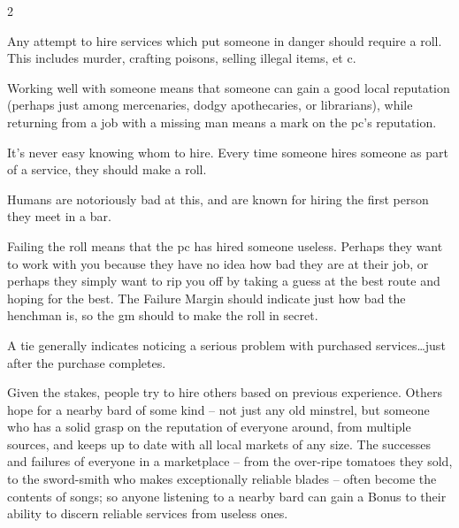 \begin{multicols}{2}

Any attempt to hire services which put someone in danger should require a roll.
This includes murder, crafting poisons, selling illegal items, et c.

Working well with someone means that someone can gain a good local reputation (perhaps just among mercenaries, dodgy apothecaries, or librarians), while returning from a job with a missing man means a mark on the \gls{pc}'s reputation.

It's never easy knowing whom to hire.
Every time someone hires someone as part of a service, they should make a roll.

Humans are notoriously bad at this, and are known for hiring the first person they meet in a bar.

Failing the roll means that the \gls{pc} has hired someone useless.
Perhaps they want to work with you because they have no idea how bad they are at their job, or perhaps they simply want to rip you off by taking a guess at the best route and hoping for the best.
The Failure Margin should indicate just how bad the henchman is, so the \gls{gm} should to make the roll in secret.

A tie generally indicates noticing a serious problem with purchased services\ldots just after the purchase completes.

Given the stakes, people try to hire others based on previous experience.
Others hope for a nearby bard of some kind -- not just any old minstrel, but someone who has a solid grasp on the reputation of everyone around, from multiple sources, and keeps up to date with all local markets of any size.
The successes and failures of everyone in a marketplace -- from the over-ripe tomatoes they sold, to the sword-smith who makes exceptionally reliable blades -- often become the contents of songs; so anyone listening to a nearby bard can gain a Bonus to their ability to discern reliable services from useless ones.


\end{multicols}
